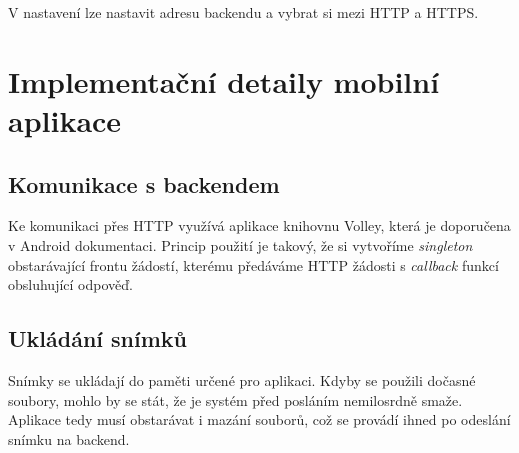 V nastavení lze nastavit adresu backendu a vybrat si mezi HTTP a HTTPS.

\section{Implementační detaily mobilní aplikace}

\subsection{Komunikace s backendem}

Ke komunikaci přes HTTP využívá aplikace knihovnu Volley, která je doporučena
v Android dokumentaci. Princip použití je takový, že si vytvoříme
\textit{singleton} obstarávající frontu žádostí, kterému předáváme HTTP žádosti s
\textit{callback} funkcí obsluhující odpověď. \citep[viz][]{Volley1}

\subsection{Ukládání snímků}

Snímky se ukládají do paměti určené pro aplikaci. Kdyby se použili dočasné soubory,
mohlo by se stát, že je systém před posláním nemilosrdně smaže.
\citep[viz][]{AndroidMem}
Aplikace tedy musí obstarávat i mazání souborů, což se provádí
ihned po odeslání snímku na backend.
